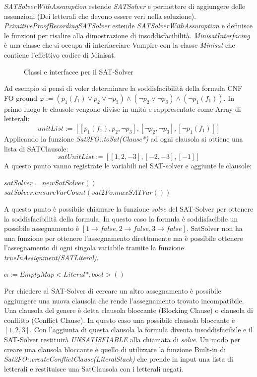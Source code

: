 \documentclass[./main.tex]{subfiles}
\begin{document}
\textit{SATSolverWithAssumption} estende \textit{SATSolver} e permettere di aggiungere delle assunzioni (Dei letterali che devono essere veri nella soluzione).
\textit{PrimitiveProofRecordingSATSolver} estende \textit{SATSolverWithAssumption} e definisce le funzioni per risalire alla dimostrazione di insoddisfacibilità.
\textit{MinisatInterfacing} è una classe che si occupa di interfacciare Vampire con la classe \textit{Minisat} che contiene
l'effettivo codice di Minisat.

\begin{figure}[h]
    \centering
    \scalebox{0.5}{
        
    }
    \caption{Classi e interfacce per il SAT-Solver}
    \label{fig:vampire_sat_solver}
\end{figure}

Ad esempio si pensi di voler determinare la soddisfacibilità della formula CNF FO ground 
$\varphi := (p_1(f_1) \lor p_2 \lor \lnot p_3) \land (\lnot p_2 \lor \lnot p_3) \land (\lnot p_1(f_1))$.
In primo luogo le clausole vengono divise in unità e rappresentate come Array di letterali:
$$unitList := [[p_1(f_1), p_2, \lnot p_3], [\lnot p_2, \lnot p_3], [\lnot p_1(f_1)]]$$
Applicando la funzione \textit{Sat2FO::toSat(Clause*)} ad ogni clausola si ottiene una lista di SATClausole:
$$satUnitList := [[1, 2, -3], [-2, -3], [-1]]$$
A questo punto vanno registrate le variabili nel SAT-solver e aggiunte le clausole:

$satSolver = new SatSolver()$ \\
$satSolver.ensureVarCount(sat2Fo.maxSATVar())$ \\

A questo punto è possibile chiamare la funzione \textit{solve} del SAT-Solver per ottenere la soddisfacibilità della formula.
In questo caso la formula è soddisfacibile un possibile assegnamento è $[1 \rightarrow false, 2 \rightarrow false, 3 \rightarrow false]$.
SatSolver non ha una funzione per ottenere l'assegnamento direttamente ma è possibile ottenere l'assegnamento di ogni singola variabile
tramite la funzione \textit{trueInAssignment(SATLiteral)}.

$\alpha := EmptyMap<Literal*, bool>()$ \\


Per chiedere al SAT-Solver di cercare un altro assegnamento è possibile aggiungere una nuova clausola 
che rende l'assegnamento trovato incompatibile. Una clausola del genere è detta clausola bloccante (Blocking Clause) o clausola di conflitto (Conflict Clause).
In questo caso una possibile clausola bloccante è $[1,2,3]$. 
Con l'aggiunta di questa clausola la formula diventa insoddisfacibile e il SAT-Solver restituirà \textit{UNSATISFIABLE} alla chiamata di \textit{solve}.
Un modo per creare una clausola bloccante è quello di utilizzare la funzione Built-in di \textit{Sat2FO::createConflictClause(LiteralStack)}
che prende in input una lista di letterali e restituisce una SatClausola con i letterali negati.
\end{document}
